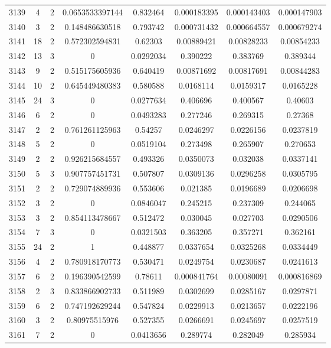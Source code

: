 \begin{longtable}{|c|c|c|c|c|c|c|c|}
3139 & 4 & 2 & 0.0653533397144 & 0.832464 & 0.000183395 & 0.000143403 & 0.000147903 \\
3140 & 3 & 2 & 0.148486630518 & 0.793742 & 0.000731432 & 0.000664557 & 0.000679274 \\
3141 & 18 & 2 & 0.572302594831 & 0.62303 & 0.00889421 & 0.00828233 & 0.00854233 \\
3142 & 13 & 3 & 0 & 0.0292034 & 0.390222 & 0.383769 & 0.389344 \\
3143 & 9 & 2 & 0.515175605936 & 0.640419 & 0.00871692 & 0.00817691 & 0.00844283 \\
3144 & 10 & 2 & 0.645449480383 & 0.580588 & 0.0168114 & 0.0159317 & 0.0165228 \\
3145 & 24 & 3 & 0 & 0.0277634 & 0.406696 & 0.400567 & 0.40603 \\
3146 & 6 & 2 & 0 & 0.0493283 & 0.277246 & 0.269315 & 0.27368 \\
3147 & 2 & 2 & 0.761261125963 & 0.54257 & 0.0246297 & 0.0226156 & 0.0237819 \\
3148 & 5 & 2 & 0 & 0.0519104 & 0.273498 & 0.265907 & 0.270653 \\
3149 & 2 & 2 & 0.926215684557 & 0.493326 & 0.0350073 & 0.032038 & 0.0337141 \\
3150 & 5 & 3 & 0.907757451731 & 0.507807 & 0.0309136 & 0.0296258 & 0.0305795 \\
3151 & 2 & 2 & 0.729074889936 & 0.553606 & 0.021385 & 0.0196689 & 0.0206698 \\
3152 & 3 & 2 & 0 & 0.0846047 & 0.245215 & 0.237309 & 0.244065 \\
3153 & 3 & 2 & 0.854113478667 & 0.512472 & 0.030045 & 0.027703 & 0.0290506 \\
3154 & 7 & 3 & 0 & 0.0321503 & 0.363205 & 0.357271 & 0.362161 \\
3155 & 24 & 2 & 1 & 0.448877 & 0.0337654 & 0.0325268 & 0.0334449 \\
3156 & 4 & 2 & 0.780918170773 & 0.530471 & 0.0249754 & 0.0230687 & 0.0241613 \\
3157 & 6 & 2 & 0.196390542599 & 0.78611 & 0.000841764 & 0.00080091 & 0.000816869 \\
3158 & 2 & 3 & 0.833866902733 & 0.511989 & 0.0302699 & 0.0285167 & 0.0297871 \\
3159 & 6 & 2 & 0.747192629244 & 0.547824 & 0.0229913 & 0.0213657 & 0.0222196 \\
3160 & 3 & 2 & 0.80975515976 & 0.527355 & 0.0266691 & 0.0245697 & 0.0257519 \\
3161 & 7 & 2 & 0 & 0.0413656 & 0.289774 & 0.282049 & 0.285934 \\

\end{longtable}
